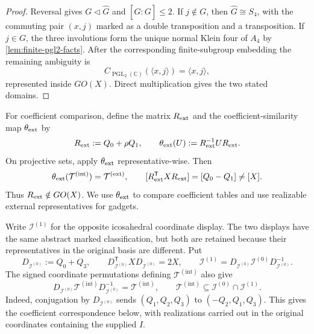 \documentclass[11pt,letterpaper,onecolumn]{article}
\theoremstyle{plain}
\theoremstyle{definition}
\theoremstyle{remark}
\newcommand{\TetInt}{{\mathcal T^{(\mathrm{int})}}}
\newcommand{\TetExt}{{\mathcal T^{(\mathrm{ext})}}}
\newcommand{\IcoZero}{{\mathcal I^{(0)}}}
\newcommand{\IcoOne}{{\mathcal I^{(1)}}}
\newcommand{\PGL}{\operatorname{PGL}}
\begin{document}
\begin{proof}
Reversal gives \(G\triangleleft \widehat G\) and \([\widehat G:G]\le2\).  If \(j\notin G\),
then \(\widehat G\cong S_4\), with the commuting pair \((x,j)\) marked as a double
transposition and a transposition. If \(j\in G\), the three involutions form
the unique normal Klein four of \(A_4\) by
\cref{lem:finite-pgl2-facts}.  After the corresponding
finite-subgroup embedding the remaining ambiguity is
\[
 C_{\PGL_2(\mathbb C)}(\langle x,j\rangle)=\langle x,j\rangle,
\]
represented inside \(GO(X)\).  Direct multiplication gives the two stated
domains.
\end{proof}

For coefficient comparison, define the matrix \(R_{\rm ext}\)
and the coefficient-similarity map \(\theta_{\rm ext}\) by
\begin{equation*}
 R_{\rm ext}:=Q_0+\rho Q_1,
 \qquad \theta_{\rm ext}(U):=R_{\rm ext}^{-1}UR_{\rm ext}.
\end{equation*}
On projective sets, apply \(\theta_{\rm ext}\) representative-wise.  Then
\begin{equation*}
 \theta_{\rm ext}(\TetInt)=\TetExt,
 \qquad
 [R_{\rm ext}^{\mathsf T}XR_{\rm ext}]=[Q_0-Q_1]\ne[X].
\end{equation*}
Thus \(R_{\rm ext}\notin GO(X)\). We use \(\theta_{\rm ext}\) to compare
coefficient tables and use realizable external representatives for gadgets.

Write \(\IcoOne\) for the opposite icosahedral coordinate display.  The
two displays have the same abstract marked classification, but both are
retained because their representatives in the original basis are different.  Put
\hypertarget{eq:icosahedral-chirality}{}
\begin{equation*}
  D_{\IcoZero}:=Q_0+Q_3,
  \qquad
  D_{\IcoZero}^{\mathsf T}XD_{\IcoZero}=2X,
  \qquad
  \IcoOne=D_{\IcoZero}\IcoZero D_{\IcoZero}^{-1}.
\end{equation*}
The signed coordinate permutations defining \(\TetInt\) also give
\[
 D_{\IcoZero}\TetInt D_{\IcoZero}^{-1}=\TetInt,
 \qquad
 \TetInt\subseteq\IcoZero\cap\IcoOne.
\]
Indeed, conjugation by \(D_{\IcoZero}\) sends
\((Q_1,Q_2,Q_3)\) to \((-Q_2,Q_1,Q_3)\).  This gives the coefficient correspondence below, with realizations
carried out in the original coordinates containing the supplied \(I\).
\end{document}
